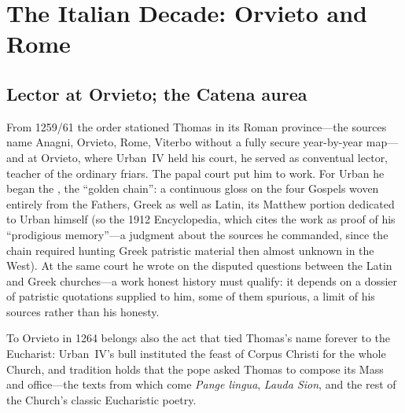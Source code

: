 \section{The Italian Decade: Orvieto and Rome}

\subsection{Lector at Orvieto; the Catena aurea}

From 1259/61 the order stationed Thomas in its Roman province---the
sources name Anagni, Orvieto, Rome, Viterbo without a fully secure
year-by-year map---and at Orvieto, where Urban~IV held his court, he
served as conventual lector, teacher of the ordinary friars. The papal
court put him to work. For Urban he began the , the
``golden chain'': a continuous gloss on the four Gospels woven entirely
from the Fathers, Greek as well as Latin, its Matthew portion dedicated
to Urban himself (so the 1912 Encyclopedia, which cites the work as proof
of his ``prodigious memory''---a judgment about the sources he commanded,
since the chain required hunting Greek patristic material then almost
unknown in the West). At the same court he wrote  on the disputed questions between the Latin and Greek
churches---a work honest history must qualify: it depends on a dossier of
patristic quotations supplied to him, some of them spurious, a limit of
his sources rather than his honesty.

To Orvieto in 1264 belongs also the act that tied Thomas's name forever
to the Eucharist: Urban~IV's bull  instituted the feast
of Corpus Christi for the whole Church, and tradition holds that the pope
asked Thomas to compose its Mass and office---the texts from which come
\textit{Pange lingua}, \textit{Lauda Sion}, and the rest of the Church's
classic Eucharistic poetry.


